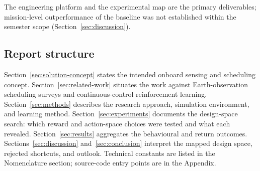 The engineering platform and the experimental map are the primary deliverables; mission-level outperformance of the baseline was not established within the semester scope (Section~\ref{sec:discussion}).

\subsection{Report structure}
Section~\ref{sec:solution-concept} states the intended onboard sensing and scheduling concept.
Section~\ref{sec:related-work} situates the work against Earth-observation scheduling surveys and continuous-control reinforcement learning.
Section~\ref{sec:methods} describes the research approach, simulation environment, and learning method.
Section~\ref{sec:experiments} documents the design-space search: which reward and action-space choices were tested and what each revealed.
Section~\ref{sec:results} aggregates the behavioural and return outcomes.
Sections~\ref{sec:discussion} and~\ref{sec:conclusion} interpret the mapped design space, rejected shortcuts, and outlook.
Technical constants are listed in the Nomenclature section; source-code entry points are in the Appendix.
